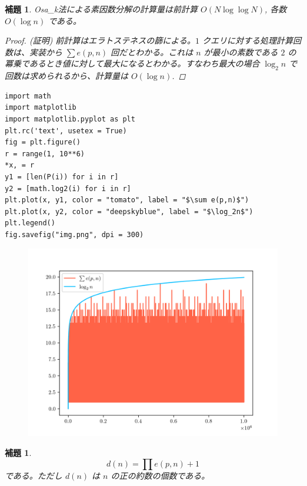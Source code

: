 \documentclass[12pt, a4j]{ltjsarticle}
\newtheorem{lem}[thm]{補題}
\begin{document}
\begin{lem}
Osa\_k法による素因数分解の計算量は前計算 $O(N \log\log N)$, 各数 $O(\log n)$ である。
\begin{proof}(証明)
前計算はエラトステネスの篩による。$1$ クエリに対する処理計算回数は、実装から $\sum e(p,n)$ 回だとわかる。これは $n$ が最小の素数である $2$ の冪乗であるとき値に対して最大になるとわかる。すなわち最大の場合 $\log_2n$ で回数は求められるから、計算量は $O(\log n)$.
\end{proof}
\vspace{6mm}\upshape
\begin{lstlisting}[frame = none]
import math
import matplotlib
import matplotlib.pyplot as plt
plt.rc('text', usetex = True)
fig = plt.figure()
r = range(1, 10**6)
*x, = r
y1 = [len(P(i)) for i in r]
y2 = [math.log2(i) for i in r]
plt.plot(x, y1, color = "tomato", label = "$\sum e(p,n)$")
plt.plot(x, y2, color = "deepskyblue", label = "$\log_2n$")
plt.legend()
fig.savefig("img.png", dpi = 300)
\end{lstlisting}
\vspace{-2cm}
\begin{figure}[b]
 \centering
 \includegraphics[keepaspectratio, scale=0.95]{img.png}
\end{figure}
\end{lem}

\vspace{1cm}

\begin{lem}\label{lem:dn}
\begin{equation}
d(n) = \prod e(p, n) + 1
\end{equation}
である。ただし $d(n)$ は $n$ の正の約数の個数である。
\end{lem}
\end{document}
